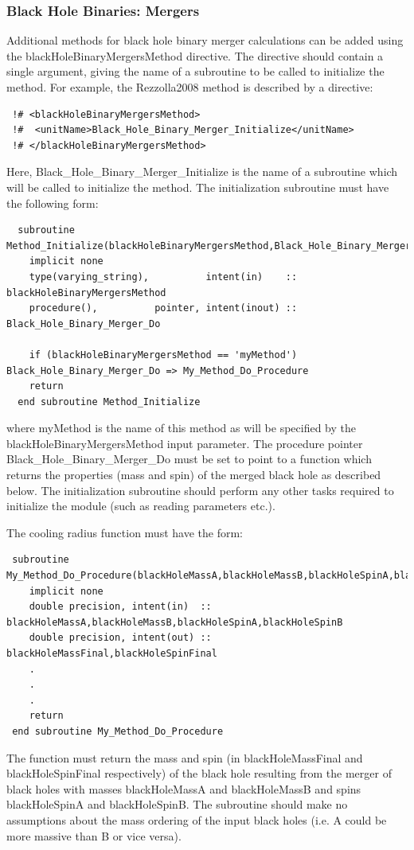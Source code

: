 \subsubsection{Black Hole Binaries: Mergers}\label{sec:BlackHoleBinaryMergers}

Additional methods for black hole binary merger calculations can be added using the {\normalfont \ttfamily blackHoleBinaryMergersMethod} directive. The directive should contain a single argument, giving the name of a subroutine to be called to initialize the method. For example, the {\normalfont \ttfamily Rezzolla2008} method is described by a directive:
\begin{verbatim}
 !# <blackHoleBinaryMergersMethod>
 !#  <unitName>Black_Hole_Binary_Merger_Initialize</unitName>
 !# </blackHoleBinaryMergersMethod>
\end{verbatim}
Here, {\normalfont \ttfamily Black\_Hole\_Binary\_Merger\_Initialize} is the name of a subroutine which will be called to initialize the method. The initialization subroutine must have the following form:
\begin{verbatim}
  subroutine Method_Initialize(blackHoleBinaryMergersMethod,Black_Hole_Binary_Merger_Do)
    implicit none
    type(varying_string),          intent(in)    :: blackHoleBinaryMergersMethod
    procedure(),          pointer, intent(inout) :: Black_Hole_Binary_Merger_Do
    
    if (blackHoleBinaryMergersMethod == 'myMethod') Black_Hole_Binary_Merger_Do => My_Method_Do_Procedure
    return
  end subroutine Method_Initialize
\end{verbatim}
where {\normalfont \ttfamily myMethod} is the name of this method as will be specified by the {\normalfont \ttfamily blackHoleBinaryMergersMethod} input parameter. The procedure pointer {\normalfont \ttfamily Black\_Hole\_Binary\_Merger\_Do} must be set to point to a function which returns the properties (mass and spin) of the merged black hole as described below. The initialization subroutine should perform any other tasks required to initialize the module (such as reading parameters etc.).

The cooling radius function must have the form:
\begin{verbatim}
 subroutine My_Method_Do_Procedure(blackHoleMassA,blackHoleMassB,blackHoleSpinA,blackHoleSpinB,blackHoleMassFinal,blackHoleSpinFinal)
    implicit none
    double precision, intent(in)  :: blackHoleMassA,blackHoleMassB,blackHoleSpinA,blackHoleSpinB
    double precision, intent(out) :: blackHoleMassFinal,blackHoleSpinFinal
    .
    .
    .
    return
 end subroutine My_Method_Do_Procedure
\end{verbatim}
The function must return the mass and spin (in {\normalfont \ttfamily blackHoleMassFinal} and {\normalfont \ttfamily blackHoleSpinFinal} respectively) of the black hole resulting from the merger of black holes with masses {\normalfont \ttfamily blackHoleMassA} and {\normalfont \ttfamily blackHoleMassB} and spins {\normalfont \ttfamily blackHoleSpinA} and {\normalfont \ttfamily blackHoleSpinB}. The subroutine should make no assumptions about the mass ordering of the input black holes (i.e. A could be more massive than B or vice versa).

